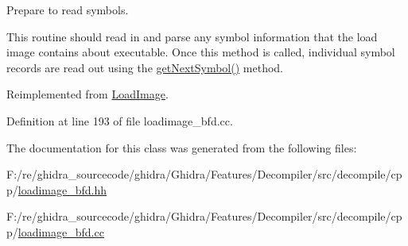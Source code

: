 Prepare to read symbols. 

This routine should read in and parse any symbol information that the load image contains about executable. Once this method is called, individual symbol records are read out using the \mbox{\hyperlink{class_load_image_bfd_a8db5bae4688dfea449ed8c5e9d584904}{get\+Next\+Symbol()}} method. 

Reimplemented from \mbox{\hyperlink{class_load_image_a5b17f1d68413ab802966bdc7aa07cc73}{Load\+Image}}.



Definition at line 193 of file loadimage\+\_\+bfd.\+cc.



The documentation for this class was generated from the following files\+:\begin{DoxyCompactItemize}
\item 
F\+:/re/ghidra\+\_\+sourcecode/ghidra/\+Ghidra/\+Features/\+Decompiler/src/decompile/cpp/\mbox{\hyperlink{loadimage__bfd_8hh}{loadimage\+\_\+bfd.\+hh}}\item 
F\+:/re/ghidra\+\_\+sourcecode/ghidra/\+Ghidra/\+Features/\+Decompiler/src/decompile/cpp/\mbox{\hyperlink{loadimage__bfd_8cc}{loadimage\+\_\+bfd.\+cc}}\end{DoxyCompactItemize}
